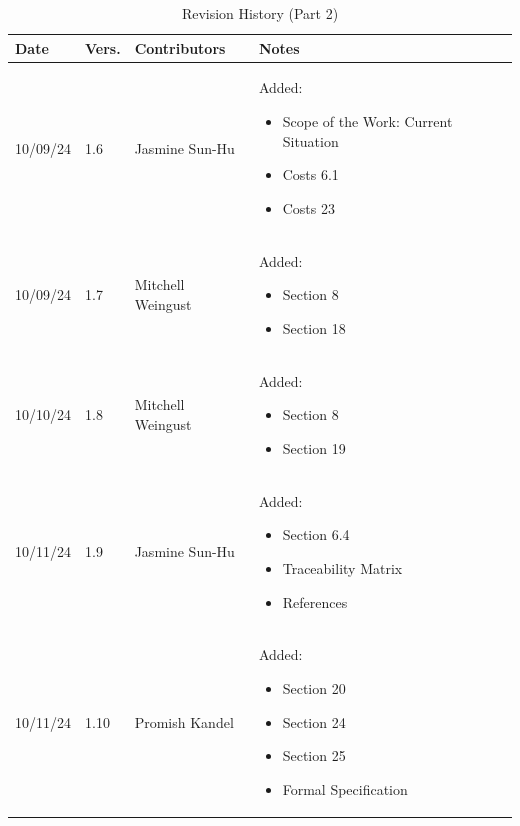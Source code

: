 \documentclass[12pt]{article}
\begin{document}
\newpage

  \begin{table}[H]
    \centering
    \caption{Revision History (Part 2)}
    \label{TblRevisionHistoryPart1}
    \begin{tabularx}{\textwidth}{p{1.5cm} p{1cm} p{3.5cm} X}
        \toprule
        \textbf{Date} & \textbf{Vers.} & \textbf{Contributors} & \textbf{Notes} \\
        \midrule
        10/09/24 & 1.6 & Jasmine Sun-Hu & Added:
      \begin{itemize}[leftmargin=*]
        \item Scope of the Work: Current Situation
        \item Costs 6.1
        \item Costs 23
      \end{itemize} \\
      10/09/24 & 1.7 & Mitchell Weingust & Added:
      \begin{itemize}[leftmargin=*]
        \item Section 8
        \item Section 18
      \end{itemize} \\
      10/10/24 & 1.8 & Mitchell Weingust & Added:
      \begin{itemize}[leftmargin=*]
        \item Section 8
        \item Section 19
      \end{itemize} \\
      10/11/24 & 1.9 & Jasmine Sun-Hu & Added:
      \begin{itemize}[leftmargin=*]
        \item Section 6.4
        \item Traceability Matrix
        \item References
      \end{itemize} \\
      10/11/24 & 1.10 & Promish Kandel & Added:
      \begin{itemize}[leftmargin=*]
        \item Section 20
        \item Section 24
        \item Section 25
        \item Formal Specification
      \end{itemize} \\

\end{tabularx}
\end{table}
\end{document}
